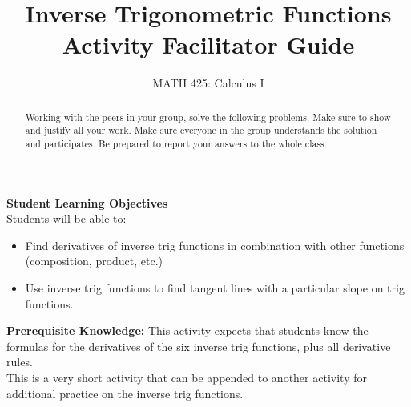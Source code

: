 \documentclass{ximera}
\title{Inverse Trigonometric Functions Activity Facilitator Guide}
\author{MATH 425: Calculus I}
\begin{document}
\begin{abstract}
    Working with the peers in your group, solve the following problems. Make sure to show and justify all your work. Make sure everyone in the group understands the solution and participates. Be prepared to report your answers to the whole class. 
\end{abstract}
\maketitle

\textbf{Student Learning Objectives}\\
Students will be able to:
    \begin{itemize}
        \item Find derivatives of inverse trig functions in combination with other functions (composition, product, etc.)
        \item Use inverse trig functions to find tangent lines with a particular slope on trig functions.
    \end{itemize}

\textbf{Prerequisite Knowledge:} This activity expects that students know the formulas for the derivatives of the six inverse trig functions, plus all derivative rules. \\

This is a very short activity that can be appended to another activity for additional practice on the inverse trig functions.
\end{document}

